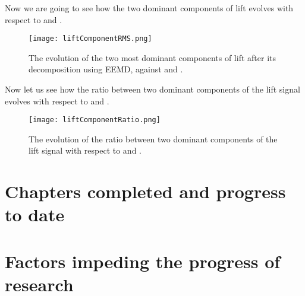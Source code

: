 \documentclass[a4paper]{article}
\begin{document}
Now we are going to see how the two dominant components of lift evolves with respect to \ured{} and \ptlt{}.

\begin{figure}[h]
  \centering
  \texttt{[image: liftComponentRMS.png]}
  \caption{The evolution of the two most dominant components of lift after its decomposition using EEMD, against \ured{} and \ptlt{}.}
  \label{fig:liftcomp}
\end{figure}

Now let us see how the ratio between two dominant components of the lift signal evolves with respect to \ured{} and \ptlt{}.

\begin{figure}[h]
  \centering
  \texttt{[image: liftComponentRatio.png]}
  \caption{The evolution of the ratio between two dominant components of the lift signal with respect to \ured{} and \ptlt{}.}
  \label{fig:liftcomprat}
\end{figure}

\newpage

\section{Chapters completed and progress to date}

\section{Factors impeding the progress of research}

\printbibliography
\end{document}
